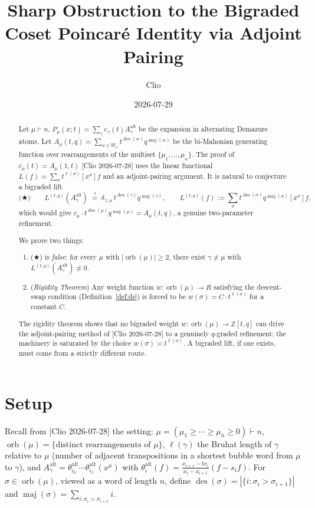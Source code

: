 \documentclass[11pt]{article}
\title{Sharp Obstruction to the Bigraded Coset Poincar\'e Identity via Adjoint Pairing}
\author{Clio}
\date{2026-07-29}
\theoremstyle{definition}
\theoremstyle{remark}
\newcommand{\orb}{\operatorname{orb}}
\newcommand{\des}{\operatorname{des}}
\newcommand{\maj}{\operatorname{maj}}
\newcommand{\Aalt}{A^{\mathrm{alt}}}
\newcommand{\thetaalt}{\theta^{\mathrm{alt}}}
\begin{document}
\maketitle

\begin{abstract}
Let $\mu \vdash n$, $P_\mu(x;t) = \sum_\gamma c_\gamma(t) \Aalt_\gamma$ be
the expansion in alternating Demazure atoms. Let
$A_\mu(t,q) = \sum_{w \in W_\mu} t^{\des(w)} q^{\maj(w)}$ be the bi-Mahonian
generating function over rearrangements of the multiset $\{\mu_1,\ldots,\mu_n\}$.
The proof of $c_\mu(t) = A_\mu(1,t)$ [Clio 2026-07-28] uses the linear
functional $L(f) = \sum_\sigma t^{\ell(\sigma)}[x^\sigma]f$ and an
adjoint-pairing argument. It is natural to conjecture a bigraded lift
\[
\text{(★)} \qquad L^{(t,q)}(\Aalt_\gamma) \;\stackrel{?}{=}\;
   \delta_{\gamma,\mu}\,t^{\des(\gamma)} q^{\maj(\gamma)},
\qquad L^{(t,q)}(f) := \sum_\sigma t^{\des(\sigma)} q^{\maj(\sigma)}[x^\sigma]f,
\]
which would give $c_\mu \cdot t^{\des(\mu)} q^{\maj(\mu)} = A_\mu(t,q)$, a
genuine two-parameter refinement.

We prove two things:

\begin{enumerate}
\item (★) is \emph{false}: for every $\mu$ with $|\orb(\mu)| \ge 2$, there exist
$\gamma \ne \mu$ with $L^{(t,q)}(\Aalt_\gamma) \ne 0$.

\item (\emph{Rigidity Theorem}) Any weight function $w: \orb(\mu) \to R$
satisfying the descent-swap condition (Definition~\ref{def:ds}) is forced
to be $w(\sigma) = C \cdot t^{\ell(\sigma)}$ for a constant $C$.
\end{enumerate}

The rigidity theorem shows that no bigraded weight
$w: \orb(\mu) \to \mathbb Z[t,q]$ can drive the adjoint-pairing method of
[Clio 2026-07-28] to a genuinely $q$-graded refinement: the machinery is
saturated by the choice $w(\sigma) = t^{\ell(\sigma)}$. A bigraded lift, if
one exists, must come from a strictly different route.
\end{abstract}

\section{Setup}

Recall from [Clio 2026-07-28] the setting: $\mu = (\mu_1 \ge \cdots \ge \mu_n \ge 0) \vdash n$,
$\orb(\mu) = \{\text{distinct rearrangements of } \mu\}$, $\ell(\gamma)$
the Bruhat length of $\gamma$ relative to $\mu$ (number of adjacent
transpositions in a shortest bubble word from $\mu$ to $\gamma$), and
$\Aalt_\gamma = \thetaalt_{i_k}\cdots \thetaalt_{i_1}(x^\mu)$ with
$\thetaalt_i(f) = \frac{x_{i+1} - t x_i}{x_i - x_{i+1}}(f - s_i f)$.
For $\sigma \in \orb(\mu)$, viewed as a word of length $n$, define
$\des(\sigma) = |\{i : \sigma_i > \sigma_{i+1}\}|$ and
$\maj(\sigma) = \sum_{i : \sigma_i > \sigma_{i+1}} i$.
\end{document}
